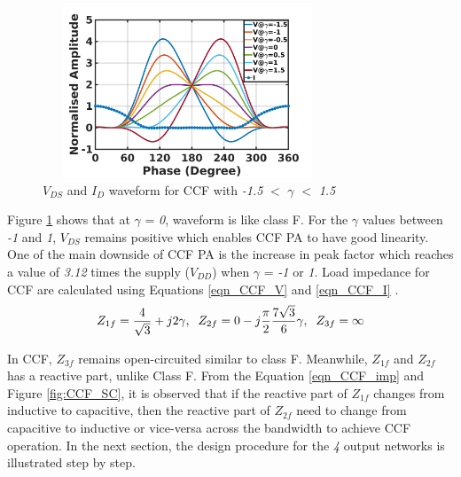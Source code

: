 \documentclass[conference]{IEEEtran}
\begin{document}
\begin{figure}[!t]
\centering
\captionsetup{font=footnotesize}
\includegraphics[width=3.4in, height=2in]{Images/CCF/CCF_wave_VI.jpg}
\caption{$V_{DS}$ and $I_D$ waveform for CCF with \textit{-1.5} $<$ $\gamma$ $<$ \textit{1.5}}
\label{fig:CCF_wave_VI}
\vspace{-0.25in}
\end{figure}

Figure \ref{fig:CCF_wave_VI} shows that at $\gamma$ = \textit{0}, waveform is like class F. For the $\gamma$ values between \textit{-1} and \textit{1}, $V_{DS}$ remains positive which enables CCF PA to have good linearity. One of the main downside of CCF PA is the increase in peak factor which reaches a value of \textit{3.12} times the supply ($V_{DD}$) when $\gamma$ = \textit{-1} or \textit{1}. 
Load impedance for CCF are calculated using Equations \ref{eqn_CCF_V} and \ref{eqn_CCF_I} \cite{CCFDesign_ali}.
\begin{equation}
\begin{aligned}
Z_{1f}=\frac{4}{\sqrt{3}}+j 2 \gamma, \hspace{2mm}
Z_{2f}=0-j \frac{\pi}{2} \frac{7 \sqrt{3}}{6} \gamma,\hspace{2mm}
Z_{3f}=\infty
\label{eqn_CCF_imp}
\end{aligned}
\end{equation}

In CCF, $Z_{3f}$ remains open-circuited similar to class F. Meanwhile, $Z_{1f}$ and $Z_{2f}$ has a reactive part, unlike Class F. From the Equation \ref{eqn_CCF_imp} and Figure \ref{fig:CCF_SC}, it is observed that if the reactive part of $Z_{1f}$ changes from inductive to capacitive, then the reactive part of $Z_{2f}$ need to change from capacitive to inductive or vice-versa across the bandwidth to achieve CCF operation. In the next section, the design procedure for the \textit{4} output networks is illustrated step by step.
\end{document}
